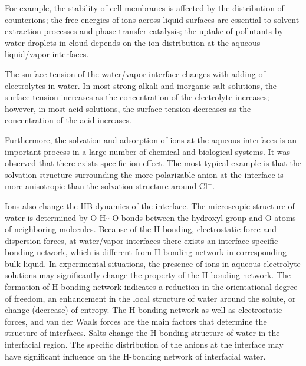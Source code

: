 For example, the stability of cell membranes is affected by the distribution of counterions\cite{Veziriglu1990}; 
the free energies of ions across liquid surfaces are essential to solvent extraction processes and phase transfer catalysis\cite{Starks1994};
the uptake of pollutants by water droplets in cloud depends on the ion distribution at the aqueous liquid/vapor interfaces.
%

The surface tension of the water/vapor interface changes with adding of electrolytes in water\cite{Pegram2006}.
In most strong alkali and inorganic salt solutions, the surface tension increases as the concentration of the electrolyte increases; 
however, in most acid solutions, the surface tension decreases as the concentration of the acid increases.
%

Furthermore, the solvation and adsorption of ions at the aqueous interfaces is an important process in a large number of chemical and biological systems\cite{Chang06}.
It was observed that there exists specific ion effect. 
The most typical example is that the solvation structure surrounding the more polarizable \I anion at the interface is more anisotropic than the solvation structure around Cl$^-$.
%

Ions also change the HB dynamics of the interface.
The microscopic structure of water is determined by O-H$\cdots$O bonds between the hydroxyl group 
and O atoms of neighboring molecules. 
Because of the H-bonding, electrostatic force and dispersion forces, 
at water/vapor interfaces there exists an interface-specific bonding network, 
which is different from H-bonding network in corresponding bulk liquid\cite{Allongue96,Velasco-Velez14}.
In experimental situations, the presence of ions in aqueous 
electrolyte solutions may significantly change the property of the H-bonding network. 
The formation of H-bonding network indicates a reduction in the orientational degree of freedom, 
an enhancement in the local structure of water around the solute, or change (decrease) of entropy\cite{Frank45a, Frank45b,Frank45c}.
%
The H-bonding network\cite{Eisenberg1969,Speedy1976,Poole1994,Soper2008b,Ball2001,Nilsson2011,Pettersson2015} as well as electrostatic forces, 
and van der Waals forces are the main factors that determine the structure of interfaces. 
Salts change the H-bonding structure of water in the interfacial region\cite{EAR04,McLain2006,Ball2008}. 
The specific distribution of the anions at the interface may have significant influence on the H-bonding network of interfacial water\cite{Morita2008}.

